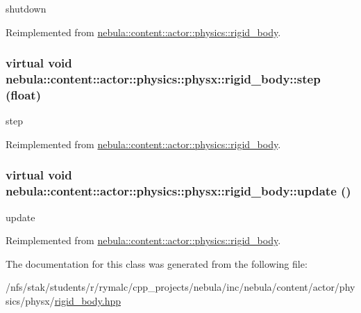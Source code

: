 shutdown 

Reimplemented from \hyperlink{classnebula_1_1content_1_1actor_1_1physics_1_1rigid__body_a99b70594f437d666ec7ee33e4d36c964}{nebula::content::actor::physics::rigid\_\-body}.\hypertarget{classnebula_1_1content_1_1actor_1_1physics_1_1physx_1_1rigid__body_a2f72e8366fb89b7a65d938b7a5082c6b}{
\subsubsection[{step}]{\setlength{\rightskip}{0pt plus 5cm}virtual void nebula::content::actor::physics::physx::rigid\_\-body::step (float)}}
\label{classnebula_1_1content_1_1actor_1_1physics_1_1physx_1_1rigid__body_a2f72e8366fb89b7a65d938b7a5082c6b}


step 

Reimplemented from \hyperlink{classnebula_1_1content_1_1actor_1_1physics_1_1rigid__body_a480452963a16809aef9a8bd80bce1d16}{nebula::content::actor::physics::rigid\_\-body}.\hypertarget{classnebula_1_1content_1_1actor_1_1physics_1_1physx_1_1rigid__body_a4bd2572632f4e23314db0857e52b079c}{
\subsubsection[{update}]{\setlength{\rightskip}{0pt plus 5cm}virtual void nebula::content::actor::physics::physx::rigid\_\-body::update ()}}
\label{classnebula_1_1content_1_1actor_1_1physics_1_1physx_1_1rigid__body_a4bd2572632f4e23314db0857e52b079c}


update 

Reimplemented from \hyperlink{classnebula_1_1content_1_1actor_1_1physics_1_1rigid__body_a7c8c0d4a581a36f3015912d1d73166f6}{nebula::content::actor::physics::rigid\_\-body}.

The documentation for this class was generated from the following file:\begin{DoxyCompactItemize}
\item 
/nfs/stak/students/r/rymalc/cpp\_\-projects/nebula/inc/nebula/content/actor/physics/physx/\hyperlink{physics_2physx_2rigid__body_8hpp}{rigid\_\-body.hpp}\end{DoxyCompactItemize}

